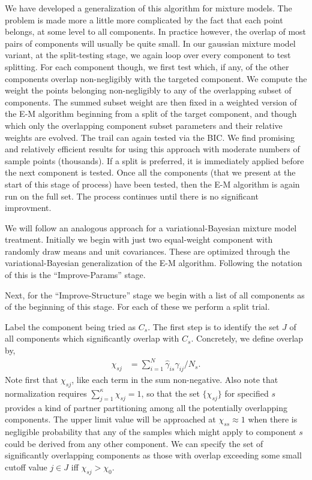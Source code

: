 \documentclass[aps,showpacs,twocolumn,prd,superscriptaddress,nofootinbib]{revtex4}
\begin{document}
We have developed a generalization of this algorithm for mixture models.  The problem is made more a little more complicated by the fact that each point belongs, at some level to all components.  In practice however, the overlap of most pairs of components will usually be quite small.  In our gaussian mixture model variant, at the split-testing stage, we again loop over every component to test splitting.  For each component though, we first test which, if any, of the other components overlap non-negligibly with the targeted component.  We compute the weight the points belonging non-negligibly to any of the overlapping subset of components.  The summed subset weight are then fixed in a weighted version of the E-M algorithm beginning from a split of the target component, and though which only the overlapping component subset parameters and their relative weights are evolved.  The trail can again tested via the BIC. We find promising and relatively efficient results for using this approach with moderate numbers of sample points (thousands). If a split is preferred, it is immediately applied before the next component is tested.  Once all the components (that we present at the start of this stage of process) have been tested, then the E-M algorithm is again run on the full set. The process continues until there is no significant improvment.

We will follow an analogous approach for a variational-Bayesian mixture model treatment.  Initially we begin with just two equal-weight component with randomly draw means and unit covariances.  These are optimized through the variational-Bayesian generalization of the E-M algorithm. Following the notation of \cite{PellegMoore2000} this is the  ``Improve-Params'' stage.

Next, for the ``Improve-Structure'' stage we begin with a list of all components as of the beginning of this stage.  For each of these we perform a split trial.

Label the component being tried as $C_s$.  The first step is to identify the set $J$ of all components which significantly overlap with $C_s$.  Concretely, we define overlap by,
\begin{align}
  \chi_{sj}&=\sum_{i=1}^N\hat\gamma_{is}\hat\gamma_{ij}/N_s.
\end{align}
Note first that $\chi_{sj}$, like each term in the sum non-negative.  Also note that normalization requires $\sum_{j=1}^\kappa\chi_{sj}=1$, so that the set $\{\chi_{sj}\}$ for specified $s$ provides a kind of partner partitioning among all the potentially overlapping components.  The upper limit value will be approached at $\chi_{ss}\approx1$ when there is negligible probability that any of the samples which might apply to component $s$ could be derived from any other component. We can specify the set of significantly overlapping components as those with overlap exceeding some small cutoff value $j\in J$ iff $\chi_{sj}>\chi_0$.
\end{document}

